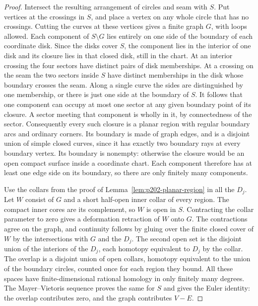 \documentclass[11pt,oneside,openany]{book}
\theoremstyle{plain}
\theoremstyle{definition}
\theoremstyle{remark}
\begin{document}
\begin{proof}
Intersect the resulting arrangement of circles and seam with \(S\).
Put vertices at the crossings in \(S\), and place a vertex on any
whole circle that has no crossings. Cutting the curves at these
vertices gives a finite graph \(G\), with loops allowed. Each
component of \(S\setminus G\) lies entirely on one side of the
boundary of each coordinate disk. Since the disks cover \(S\),
the component lies in the interior of one disk and its closure
lies in that closed disk, still in the chart. At an interior
crossing the four sectors have distinct pairs of disk memberships.
At a crossing on the seam the two sectors inside \(S\) have
distinct memberships in the disk whose boundary crosses the seam.
Along a single curve the sides are distinguished by one membership,
or there is just one side at the boundary of \(S\).
It follows that one component can occupy at most one sector at
any given boundary point of its closure. A sector meeting that
component is wholly in it, by connectedness of the sector.
Consequently every such closure is a planar region with regular
boundary arcs and ordinary corners. Its boundary is made of graph
edges, and is a disjoint union of simple closed curves, since it
has exactly two boundary rays at every boundary vertex. Its boundary
is nonempty: otherwise the closure would be an open compact surface
inside a coordinate chart. Each component therefore has at least
one edge side on its boundary, so there are only finitely many
components.

Use the collars from the proof of Lemma~\ref{lem:p202-planar-region}
in all the \(D_j\). Let \(W\) consist of \(G\) and a short
half-open inner collar of every region. The compact inner cores
are its complement, so \(W\) is open in \(S\).
Contracting the collar parameter to zero gives a deformation
retraction of \(W\) onto \(G\). The contractions agree on the graph,
and continuity follows by gluing over the finite closed cover
of \(W\) by the intersections with \(G\) and the \(D_j\).
The second open set is the disjoint union of the interiors of
the \(D_j\), each homotopy equivalent to \(D_j\) by the collar.
The overlap is a disjoint union of open collars, homotopy
equivalent to the union of the boundary circles, counted once
for each region they bound. All these spaces have finite-dimensional
rational homology in only finitely many degrees. The Mayer--Vietoris
sequence proves the same for \(S\) and gives the Euler identity:
the overlap contributes zero, and the graph contributes \(V-E\).
\end{proof}
\end{document}
